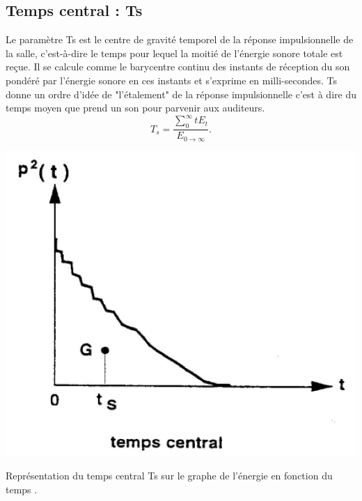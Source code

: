\subsection{Temps central : \gls{Ts}}
Le paramètre \gls{Ts} est le centre de gravité temporel de la réponse impulsionnelle de la salle, c’est-à-dire le temps pour lequel la moitié de l’énergie sonore  totale  est  reçue.  Il  se  calcule  comme  le  barycentre continu  des  instants  de  réception  du  son  pondéré  par  l’énergie  sonore  en  ces  instants et s'exprime en milli-secondes. \gls{Ts}  donne  un  ordre  d’idée  de  "l’étalement" de  la  réponse  impulsionnelle  c’est  à dire  du  temps moyen que prend un son pour parvenir aux auditeurs.
\begin{equation}
T_s =  \frac{\sum\limits_{0}^{\infty} tE_t}{E_{0\to\infty}}.
\end{equation}

\begin{figureth}
	\includegraphics[width=0.4\linewidth]{images/ts}
	\caption[Représentation du temps central \gls{Ts} sur le graphe de l'énergie en fonction du temps.]{Représentation du temps central \gls{Ts} sur le graphe de l'énergie en fonction du temps \footnotemark.}
	\label{ts}
\end{figureth}


